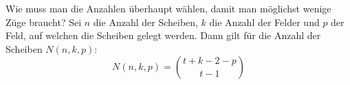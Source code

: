 \begin{frame}{Wie muss man die Anzahlen überhaupt wählen, damit man möglichst wenige Züge braucht?}
    Sei $n$ die Anzahl der Scheiben, $k$ die Anzahl der Felder und $p$ der Feld, auf welchen die Scheiben gelegt werden.
    Dann gilt für die Anzahl der Scheiben $N(n,k,p)$:
    \[N(n,k,p)=\binom{t+k-2-p}{t-1}\]
\end{frame}
